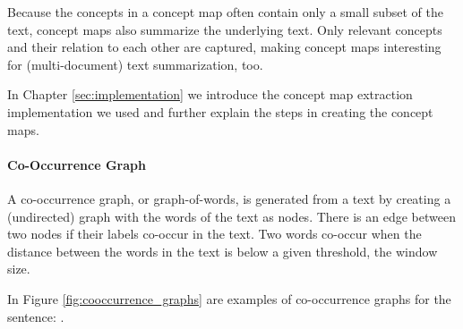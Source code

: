 Because the concepts in a concept map often contain only a small subset of the text, concept maps also summarize the underlying text.
Only relevant concepts and their relation to each other are captured, making concept maps interesting for (multi-document) text summarization, too.

In Chapter \ref{sec:implementation} we introduce the concept map extraction implementation we used and further explain the steps in creating the concept maps.


\paragraph{Co-Occurrence Graph}
A co-occurrence graph, or graph-of-words, is generated from a text by creating a (undirected) graph with the words of the text as nodes.
There is an edge between two nodes if their labels co-occur in the text.
Two words co-occur when the distance between the words in the text is below a given threshold, the window size.

In Figure \ref{fig:cooccurrence_graphs} are examples of co-occurrence graphs for the sentence: .

